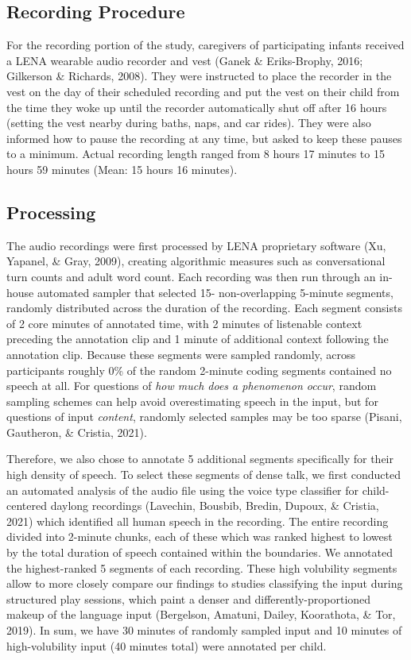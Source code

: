\documentclass[
  man]{apa6}
\begin{document}
\hypertarget{recording-procedure}{%
\subsection{Recording Procedure}\label{recording-procedure}}

For the recording portion of the study, caregivers of participating infants received a LENA wearable audio recorder and vest (Ganek \& Eriks-Brophy, 2016; Gilkerson \& Richards, 2008). They were instructed to place the recorder in the vest on the day of their scheduled recording and put the vest on their child from the time they woke up until the recorder automatically shut off after 16 hours (setting the vest nearby during baths, naps, and car rides). They were also informed how to pause the recording at any time, but asked to keep these pauses to a minimum. Actual recording length ranged from 8 hours 17 minutes to 15 hours 59 minutes (Mean: 15 hours 16 minutes).

\hypertarget{processing}{%
\subsection{Processing}\label{processing}}

The audio recordings were first processed by LENA proprietary software (Xu, Yapanel, \& Gray, 2009), creating algorithmic measures such as conversational turn counts and adult word count. Each recording was then run through an in-house automated sampler that selected 15- non-overlapping 5-minute segments, randomly distributed across the duration of the recording. Each segment consists of 2 core minutes of annotated time, with 2 minutes of listenable context preceding the annotation clip and 1 minute of additional context following the annotation clip. Because these segments were sampled randomly, across participants roughly 0\% of the random 2-minute coding segments contained no speech at all. For questions of \emph{how much does a phenomenon occur}, random sampling schemes can help avoid overestimating speech in the input, but for questions of input \emph{content}, randomly selected samples may be too sparse (Pisani, Gautheron, \& Cristia, 2021).

Therefore, we also chose to annotate 5 additional segments specifically for their high density of speech. To select these segments of dense talk, we first conducted an automated analysis of the audio file using the voice type classifier for child-centered daylong recordings (Lavechin, Bousbib, Bredin, Dupoux, \& Cristia, 2021) which identified all human speech in the recording. The entire recording divided into 2-minute chunks, each of these which was ranked highest to lowest by the total duration of speech contained within the boundaries. We annotated the highest-ranked 5 segments of each recording. These high volubility segments allow to more closely compare our findings to studies classifying the input during structured play sessions, which paint a denser and differently-proportioned makeup of the language input (Bergelson, Amatuni, Dailey, Koorathota, \& Tor, 2019). In sum, we have 30 minutes of randomly sampled input and 10 minutes of high-volubility input (40 minutes total) were annotated per child.
\end{document}
